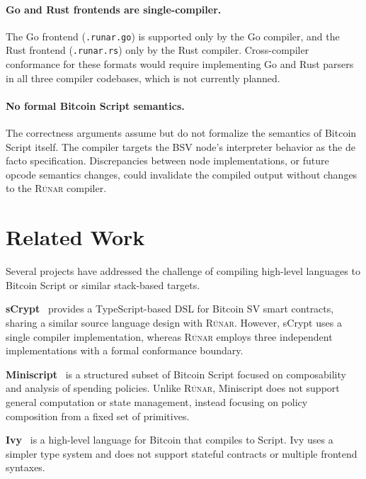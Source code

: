 \documentclass[11pt,a4paper]{article}
\newcommand{\runar}{\textsc{Rúnar}}
\begin{document}
\paragraph{Go and Rust frontends are single-compiler.}
The Go frontend (\texttt{.runar.go}) is supported only by the Go compiler,
and the Rust frontend (\texttt{.runar.rs}) only by the Rust compiler.
Cross-compiler conformance for these formats would require implementing
Go and Rust parsers in all three compiler codebases, which is not
currently planned.

\paragraph{No formal Bitcoin Script semantics.}
The correctness arguments assume but do not formalize the semantics of
Bitcoin Script itself. The compiler targets the BSV node's interpreter
behavior as the de facto specification. Discrepancies between node
implementations, or future opcode semantics changes, could invalidate
the compiled output without changes to the \runar{} compiler.

\section{Related Work}
\label{sec:related}

Several projects have addressed the challenge of compiling high-level
languages to Bitcoin Script or similar stack-based targets.

\textbf{sCrypt}~\cite{scrypt} provides a TypeScript-based DSL for Bitcoin SV
smart contracts, sharing a similar source language design with \runar{}.
However, sCrypt uses a single compiler implementation, whereas \runar{}
employs three independent implementations with a formal conformance boundary.

\textbf{Miniscript}~\cite{miniscript} is a structured subset of Bitcoin
Script focused on composability and analysis of spending policies. Unlike
\runar{}, Miniscript does not support general computation or state management,
instead focusing on policy composition from a fixed set of primitives.

\textbf{Ivy}~\cite{ivy} is a high-level language for Bitcoin that compiles
to Script. Ivy uses a simpler type system and does not support stateful
contracts or multiple frontend syntaxes.
\end{document}
